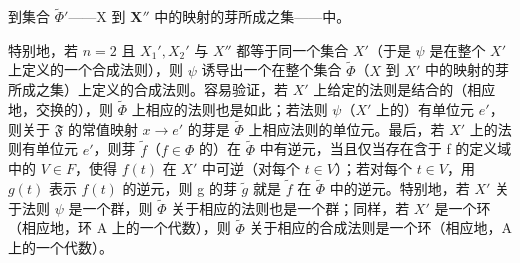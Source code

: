 到集合 \(\tilde{\Phi}'\)——X 到 \(\mathbf{X}''\) 中的映射的芽所成之集——中。

特别地，若 \(n = 2\) 且 \(X_1', X_2'\) 与 \(X''\) 都等于同一个集合 \(X'\)（于是 \(\psi\) 是在整个 \(X'\) 上定义的一个合成法则），则 \(\psi\) 诱导出一个在整个集合 \(\tilde{\Phi}\)（\(X\) 到 \(X'\) 中的映射的芽所成之集）上定义的合成法则。容易验证，若 \(X'\) 上给定的法则是结合的（相应地，交换的），则 \(\tilde{\Phi}\) 上相应的法则也是如此；若法则 \(\psi\)（\(X'\) 上的）有单位元 \(e'\)，则关于 \(\mathfrak{F}\) 的常值映射 \(x \to e'\) 的芽是 \(\tilde{\Phi}\) 上相应法则的单位元。最后，若 \(X'\) 上的法则有单位元 \(e'\)，则芽 \(\tilde{f}\)（\(f \in \Phi\) 的）在 \(\tilde{\Phi}\) 中有逆元，当且仅当存在含于 f 的定义域中的 \(V \in F\)，使得 \(f(t)\) 在 \(X'\) 中可逆（对每个 \(t \in V\)）；若对每个 \(t \in V\)，用 \(g(t)\) 表示 \(f(t)\) 的逆元，则 g 的芽 \(\tilde{g}\) 就是 \(\tilde{f}\) 在 \(\tilde{\Phi}\) 中的逆元。特别地，若 \(X'\) 关于法则 \(\psi\) 是一个群，则 \(\tilde{\Phi}\) 关于相应的法则也是一个群；同样，若 \(X'\) 是一个环（相应地，环 A 上的一个代数），则 \(\tilde{\Phi}\) 关于相应的合成法则是一个环（相应地，A 上的一个代数）。

